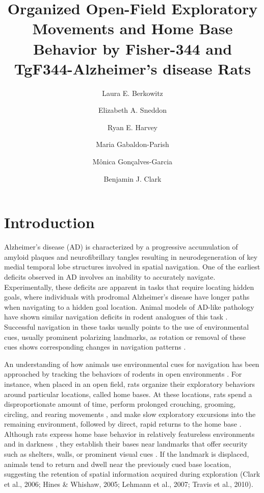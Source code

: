 \documentclass[fleqn,10pt]{wlscirep}
\title{Organized Open-Field Exploratory Movements and Home Base Behavior by Fisher-344 and TgF344-Alzheimer’s disease Rats}
\author[1,*]{Laura E. Berkowitz}
\author[1]{Elizabeth A. Sneddon}
\author[1]{Ryan E. Harvey}
\author[1]{Maria Gabaldon-Parish}
\author[1]{M\^{o}nica Gon\c{c}alves-Garcia}
\author[1,*]{Benjamin J. Clark}
\affil[1]{University of New Mexico, Psychology, Albuquerque, NM 87131, United States}
\affil[*]{bnjclark@unm.edu, lberkowitz@unm.edu}
\begin{document}
\flushbottom
\maketitle
%
%
\thispagestyle{empty}

\section*{Introduction}

Alzheimer’s disease (AD) is characterized by a progressive accumulation of amyloid plaques and neurofibrillary tangles resulting in neurodegeneration of key medial temporal lobe structures involved in spatial navigation. One of the earliest deficits observed in AD involves an inability to accurately navigate. Experimentally, these deficits are apparent in tasks that require locating hidden goals, where individuals with prodromal Alzheimer's disease have longer paths when navigating to a hidden goal location. Animal models of AD-like pathology have shown similar navigation deficits in rodent analogues of this task \cite{berkowitz_progressive_2018,janus_search_2004}. Successful navigation in these tasks usually points to the use of environmental cues, usually prominent polarizing landmarks, as rotation or removal of these cues shows corresponding changes in navigation patterns \cite{}. 

An understanding of how animals use environmental cues for navigation has been approached by tracking the behaviors of rodents in open environments \cite{dudchenko_neuroethology_2018,poulter_neurobiology_2018,thompson_behavioral_2018}. For instance, when placed in an open field, rats organize their exploratory behaviors around particular locations, called home bases. At these locations, rats spend a disproportionate amount of time, perform prolonged crouching, grooming, circling, and rearing movements \cite{eilam_home_1989}, and make slow exploratory excursions into the remaining environment, followed by direct, rapid returns to the home base \cite{wallace_nmda_2003}. Although rats express home base behavior in relatively featureless environments and in darkness \cite{eilam_home_1989,hines_home_2005,nemati_point_2007}, they establish their bases near landmarks that offer security such as shelters, walls, or prominent visual cues \cite{clark_impaired_2005,hines_home_2005,lehmann_complete_2007,wallace_nmda_2003,whishaw_exploratory_2006}. If the landmark is displaced, animals tend to return and dwell near the previously cued base location, suggesting the retention of spatial information acquired during exploration \cite{clark_impaired_2005,hines_home_2005,lehmann_complete_2007}(Clark et al., 2006; Hines \& Whishaw, 2005; Lehmann et al., 2007; Travis et al., 2010). 
\end{document}
